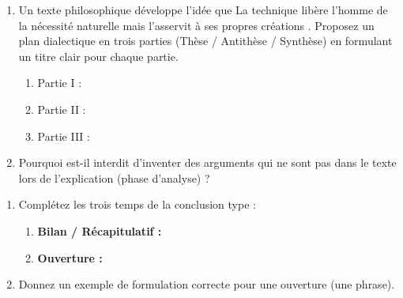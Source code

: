 \documentclass[11pt]{article}
\begin{document}
\begin{exercice}
\begin{enumerate}
    \item Un texte philosophique développe l'idée que \og La technique libère l'homme de la nécessité naturelle mais l'asservit à ses propres créations \fg{}. Proposez un plan dialectique en trois parties (Thèse / Antithèse / Synthèse) en formulant un titre clair pour chaque partie.
    \begin{enumerate}
        \item Partie I : \underline{\hspace{10cm}}
        \item Partie II : \underline{\hspace{10cm}}
        \item Partie III : \underline{\hspace{10cm}}
    \end{enumerate}
    \item Pourquoi est-il interdit d'inventer des arguments qui ne sont pas dans le texte lors de l'explication (phase d'analyse) ?
\end{enumerate}
\end{exercice}

\begin{exercice}
\begin{enumerate}
    \item Complétez les trois temps de la conclusion type :
    \begin{enumerate}
        \item \textbf{Bilan / Récapitulatif :} \underline{\hspace{10cm}}
        \item \textbf{Ouverture :} \underline{\hspace{10cm}}
    \end{enumerate}
    \item Donnez un exemple de formulation correcte pour une ouverture (une phrase).
\end{enumerate}
\end{exercice}
\end{document}
